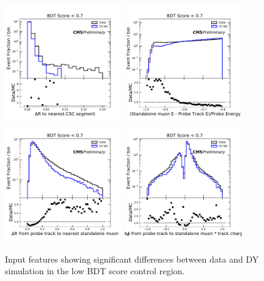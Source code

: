 \begin{figure}[htbp]
	\label{fig:lowScoreVariableMismatch}
	\centering
	\includegraphics[width=0.45\textwidth]{figures/badPartialRegioncscDR.pdf}
	\hspace{0.01\textwidth}
	\includegraphics[width=0.45\textwidth]{figures/badPartialRegionstandaloneDEoverE.pdf}
	\vspace{0.01\textwidth}
	\includegraphics[width=0.45\textwidth]{figures/badPartialRegionstaDR.pdf}
	\hspace{0.01\textwidth}
	\includegraphics[width=0.45\textwidth]{figures/badPartialRegionstaPhi.pdf} 
        \caption[Low-Score Event Validation Before Correction]{Input features showing significant differences between data and DY simulation in the low BDT score control region.}
\end{figure}

